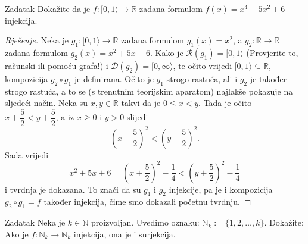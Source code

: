 \begin{exercise}{Zadatak}
Dokažite da je \(f : [0, 1\rangle\to \mathbb{R}\) zadana formulom \(f(x)=x^4+5x^2+6\) injekcija.
\end{exercise}
\begin{proof}[Rješenje]
Neka je \(g_1 : [0, 1\rangle\to \mathbb{R}\) zadana formulom \(g_1(x)=x^2\), a \(g_2 : \mathbb{R}\to \mathbb{R}\) zadana formulom \(g_2(x)=x^2+5x+6\). Kako je \(\mathcal{R}(g_1)=[0, 1\rangle\) (Provjerite to, računski ili pomoću grafa!) i \(\mathcal{D}(g_2)=[0, \infty\rangle\), te očito vrijedi \([0, 1\rangle\subseteq \mathbb{R}\), kompozicija \(g_2\circ g_1\) je definirana. Očito je \(g_1\) strogo rastuća, ali i \(g_2\) je također strogo rastuća, a to se (s trenutnim teorijskim aparatom) najlakše pokazuje na sljedeći način. Neka su \(x, y\in \mathbb{R}\) takvi da je \(0\leq x<y\). Tada je očito \(x+\dfrac{5}{2}<y+\dfrac{5}{2}\), a iz \(x\geq 0\) i \(y>0\) slijedi \[\left(x+\dfrac{5}{2}\right)^2<\left(y+\dfrac{5}{2}\right)^2.\] Sada vrijedi
\[x^2+5x+6=\left(x+\dfrac{5}{2}\right)^2-\dfrac{1}{4}<\left(y+\dfrac{5}{2}\right)^2-\dfrac{1}{4}\]
i tvrdnja je dokazana. To znači da su \(g_1\) i \(g_2\) injekcije, pa je i kompozicija \(g_2\circ g_1=f\) također injekcija, čime smo dokazali početnu tvrdnju.
\end{proof}
\begin{exercise}{Zadatak}
Neka je \(k\in \mathbb{N}\) proizvoljan. Uvedimo oznaku: \(\mathbb{N}_k:=\{1, 2,\dots, k\}\). Dokažite: Ako je \(f : \mathbb{N}_k\to \mathbb{N}_k\) injekcija, ona je i surjekcija.
\end{exercise}
